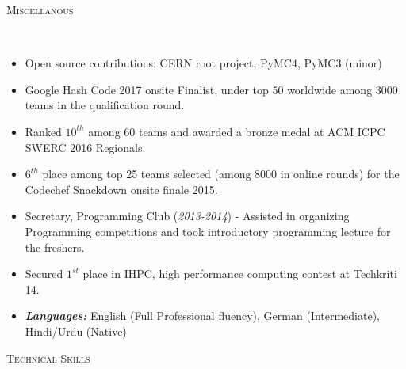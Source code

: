 \documentclass[9pt]{article}
\newenvironment{changemargin}[2]{%
  \begin{list}{}{%
      \setlength{\topsep}{0pt}%
    \setlength{\leftmargin}{#1}%
    \setlength{\rightmargin}{#2}%
    \setlength{\listparindent}{\parindent}%
  \setlength{\itemindent}{\parindent}%
    \setlength{\parsep}{\parskip}%
    }%
  \item[]}{\end{list}
    }
\newcommand{\lineover}{
  \begin{changemargin}{-0.05in}{-0.10in}
    \vspace*{-9pt}
    \hrulefill \\
    \vspace*{-2pt}
  \end{changemargin}
}
\newcommand{\header}[1]{
  \begin{changemargin}{-0.5in}{-0.5in}
    \scshape{#1}\\
        \lineover
  \end{changemargin}
}
\newenvironment{body} {
  \vspace*{-16pt}
        \begin{changemargin}{-0.6in}{-0.65in}
        }	
        {\end{changemargin}
}
\begin{document}
\vspace{2 mm}
\header{Miscellanous}
\begin{body}
  \vspace{14pt}
        \begin{changemargin}{0.15in}{0.15in}
          \begin{itemize}
            \item Open source contributions: CERN root project, PyMC4, PyMC3 (minor)
            \item Google Hash Code 2017 onsite Finalist, under top $50$ worldwide 
              among 3000 teams in the qualification round.
            \item Ranked $10^{th}$ among 60 teams and awarded a bronze medal at 
              ACM ICPC SWERC 2016 Regionals.
            \item $6^{th}$ place among top 25 teams selected (among 8000 in online 
              rounds) for the Codechef Snackdown onsite finale 2015. \\
            \item Secretary, Programming Club (\textit{2013-2014}) - Assisted in
              organizing Programming competitions 
              and took introductory programming lecture for the freshers.
            \item Secured $1^{st}$ place in IHPC, high performance computing contest at Techkriti 14. \\
            \item \emph{\textbf{Languages:}} English (Full Professional fluency), 
              German (Intermediate), Hindi/Urdu (Native)
          \end{itemize}
        \end{changemargin}
\end{body}
\vspace{3 mm}
\header{Technical Skills}
\end{document}
